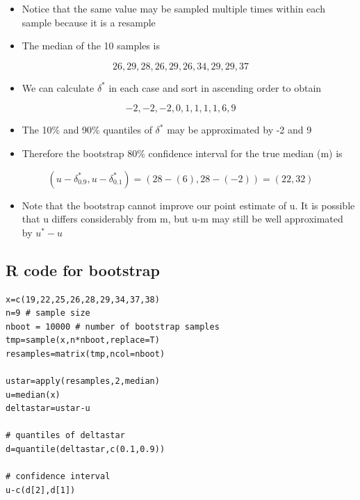 \documentclass[
]{book}
\providecommand{\tightlist}{%
  \setlength{\itemsep}{0pt}\setlength{\parskip}{0pt}}
\begin{document}
\begin{itemize}
\tightlist
\item
  Notice that the same value may be sampled multiple times within each sample because it is a resample
\item
  The median of the 10 samples is
\end{itemize}

\[26, 29, 28, 26, 29, 26, 34, 29, 29, 37\]

\begin{itemize}
\tightlist
\item
  We can calculate \(δ^*\) in each case and sort in ascending order to obtain
\end{itemize}

\[-2, -2, -2, 0, 1, 1, 1, 1, 6, 9\]

\begin{itemize}
\tightlist
\item
  The 10\% and 90\% quantiles of \(δ^*\) may be approximated by -2 and 9
\item
  Therefore the bootstrap 80\% confidence interval for the true median (m) is
\end{itemize}

\[(u-\delta^*_{0.9},u-\delta^*_{0.1})=(28-(6),28-(-2))=(22,32)\]

\begin{itemize}
\tightlist
\item
  Note that the bootstrap cannot improve our point estimate of u. It is possible that u differs considerably from m, but u-m may still be well approximated by \(u^*-u\)
\end{itemize}

\hypertarget{r-code-for-bootstrap}{%
\subsection{R code for bootstrap}\label{r-code-for-bootstrap}}

\begin{verbatim}
x=c(19,22,25,26,28,29,34,37,38)
n=9 # sample size
nboot = 10000 # number of bootstrap samples
tmp=sample(x,n*nboot,replace=T)
resamples=matrix(tmp,ncol=nboot)

ustar=apply(resamples,2,median)
u=median(x)
deltastar=ustar-u

# quantiles of deltastar
d=quantile(deltastar,c(0.1,0.9))

# confidence interval
u-c(d[2],d[1])
\end{verbatim}
\end{document}
